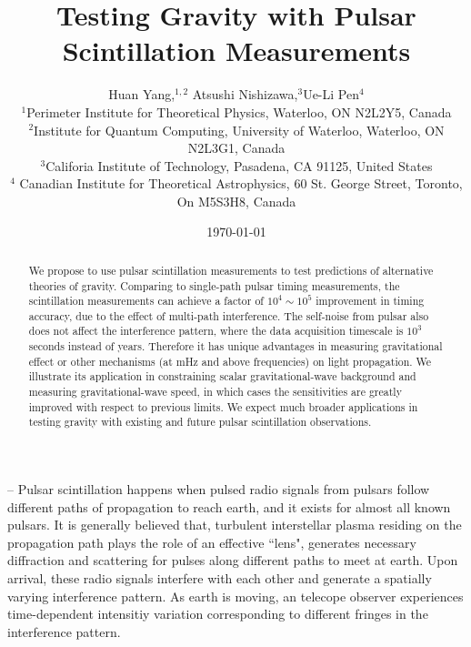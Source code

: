 \documentclass[prl,aps,floatfix,superscriptaddress,twocolumn]{revtex4}
\begin{document}
  



\title{ Testing Gravity with Pulsar Scintillation Measurements} 



\author{Huan Yang,$^{1,2}$ Atsushi Nishizawa,$^{3} $Ue-Li Pen$^{4}$\\
%
$^{1}$Perimeter Institute for Theoretical Physics, Waterloo, ON N2L2Y5, Canada\\
$^{2}$Institute for Quantum Computing, University of Waterloo, Waterloo,
ON N2L3G1, Canada\\
$^{3}$Califoria Institute of Technology, Pasadena, CA 91125, United States \\
$^{4}$ Canadian Institute for Theoretical Astrophysics, 60 St. George Street,
Toronto, On M5S3H8, Canada
}


\date{\today}





\begin{abstract}
We propose to use pulsar scintillation measurements to test predictions of alternative theories of gravity. Comparing to single-path pulsar timing measurements, the scintillation measurements can achieve a factor of $10^4 \sim 10^5 $ improvement in timing accuracy, due to the effect of multi-path interference. The self-noise from pulsar also does not affect the interference pattern, where the data acquisition timescale is $10^3$ seconds instead of years. Therefore it has unique advantages in measuring gravitational effect or other mechanisms (at mHz and above frequencies) on light propagation. We illustrate its application in constraining scalar gravitational-wave background and measuring gravitational-wave speed, in which cases the sensitivities are greatly improved with respect to previous limits. We expect much broader applications in testing gravity with existing and future pulsar scintillation observations. 
\end{abstract}

\maketitle 

 -- Pulsar scintillation happens when pulsed radio signals from pulsars follow different paths of propagation to reach earth, and it exists for almost all known pulsars. It is generally believed that, turbulent interstellar plasma residing on the propagation path plays the role of an effective ``lens", generates necessary diffraction and scattering for pulses along different paths to meet at earth. Upon arrival, these radio signals interfere with each other and generate a spatially varying interference pattern.  As earth is moving, an telecope observer experiences time-dependent intensitiy variation corresponding to different fringes in the interference pattern.
\end{document}
